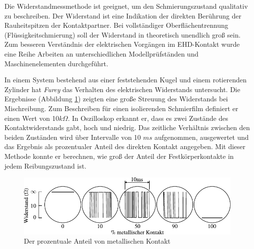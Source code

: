 Die Widerstandmessmethode ist geeignet, um den Schmierungszustand qualitativ zu beschreiben.
Der Widerstand ist eine Indikation der direkten Berührung der Rauheitspitzen der Kontaktpartner.
Bei vollständiger Oberflächentrennung (Flüssigkeitschmierung) soll der Widerstand in theoretisch unendlich groß sein.
Zum besseren Verständnis der elektrischen Vorgängen im EHD-Kontakt wurde eine Reihe Arbeiten an unterschiedlichen Modellprüfständen und Maschinenelementen durchgeführt.

In einem System bestehend aus einer feststehenden Kugel und einem rotierenden Zylinder hat \textit{Furey} \cite{furey_1961} das Verhalten des elektrischen Widerstands untersucht.
Die Ergebnisse (Abbildung \ref{fig:resistance_vs_time_furey}) zeigten eine große Streuung des Widerstands bei Mischreibung.
Zum Beschreiben für einen isolierenden Schmierfilm definiert er einen Wert von 10$k\Omega$.
In Oszilloskop erkannt er, dass es zwei Zustände des Kontaktwiderstands gabt, hoch und niedrig.
Das zeitliche Verhältnis zwischen den beiden Zuständen wird über Intervalle von 10 $ms$ aufgenommen, ausgewertet und das Ergebnis als prozentualer Anteil des direkten Kontakt angegeben.
Mit dieser Methode konnte er berechnen, wie groß der Anteil der Festkörperkontakte in jedem Reibungszustand ist.
\begin{figure}[htb]
    \centering
    \includegraphics[]{./images/resistance_vs_time_furey.pdf}
    \caption{Der prozentuale Anteil von metallischen Kontakt \cite{furey_1961}}
    \label{fig:resistance_vs_time_furey}
\end{figure}
%

